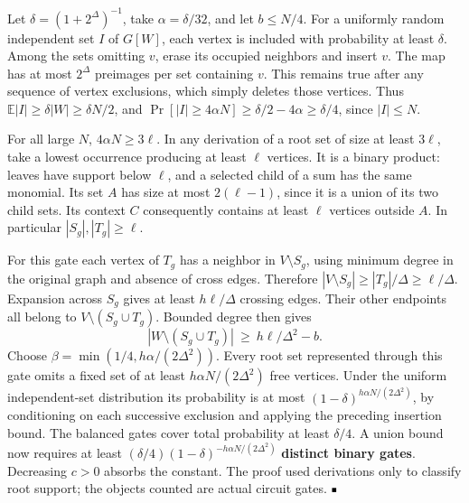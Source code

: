 \documentclass[11pt,a4paper]{article}
\renewcommand{\blacksquare}{\mathord{\vcenter{\hbox{\rule{.8ex}{.8ex}}}}}
\begin{document}
Let \(\delta=(1+2^\Delta)^{-1}\), take \(\alpha=\delta/32\), and let
\(b\le N/4\). For a uniformly random independent set \(I\) of \(G[W]\),
each vertex is included with probability at least \(\delta\). Among the
sets omitting \(v\), erase its occupied neighbors and insert \(v\). The
map has at most \(2^\Delta\) preimages per set containing \(v\). This
remains true after any sequence of vertex exclusions, which simply
deletes those vertices. Thus \(\mathbb E|I|\ge \delta|W|\ge\delta N/2\),
and \(\Pr[|I|\ge4\alpha N]\ge\delta/2-4\alpha\ge\delta/4\), since
\(|I|\le N\).

For all large \(N\), \(4\alpha N\ge3\ell\). In any derivation of a root
set of size at least \(3\ell\), take a lowest occurrence producing at
least \(\ell\) vertices. It is a binary product: leaves have support
below \(\ell\), and a selected child of a sum has the same monomial. Its
set \(A\) has size at most \(2(\ell-1)\), since it is a union of its two
child sets. Its context \(C\) consequently contains at least \(\ell\)
vertices outside \(A\). In particular \(|S_g|,|T_g|\ge\ell\).

For this gate each vertex of \(T_g\) has a neighbor in
\(V\setminus S_g\), using minimum degree in the original graph and
absence of cross edges. Therefore
\(|V\setminus S_g|\ge |T_g|/\Delta\ge\ell/\Delta\). Expansion across
\(S_g\) gives at least \(h\ell/\Delta\) crossing edges. Their other
endpoints all belong to \(V\setminus(S_g\cup T_g)\). Bounded degree then
gives \[
 |W\setminus(S_g\cup T_g)|\ \ge\ h\ell/\Delta^2-b.
\] Choose \(\beta=\min(1/4,h\alpha/(2\Delta^2))\). Every root set
represented through this gate omits a fixed set of at least
\(h\alpha N/(2\Delta^2)\) free vertices. Under the uniform
independent-set distribution its probability is at most
\((1-\delta)^{h\alpha N/(2\Delta^2)}\), by conditioning on each
successive exclusion and applying the preceding insertion bound. The
balanced gates cover total probability at least \(\delta/4\). A union
bound now requires at least
\((\delta/4)(1-\delta)^{-h\alpha N/(2\Delta^2)}\) \textbf{distinct
binary gates}. Decreasing \(c>0\) absorbs the constant. The proof used
derivations only to classify root support; the objects counted are
actual circuit gates. \(\blacksquare\)
\end{document}
